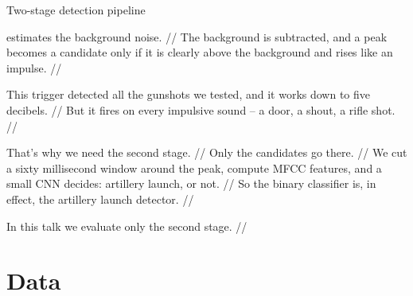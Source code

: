 \documentclass[aspectratio=169,10pt]{beamer}
\begin{document}
\begin{frame}{Two-stage detection pipeline}
{    estimates the background noise. // The background is subtracted, and a peak becomes a
    candidate only if it is clearly above the background and rises like an impulse.
    //\par\medskip
    This trigger detected all the gunshots we tested, and it works down to five decibels.
    // But it fires on every impulsive sound -- a door, a shout, a rifle shot. //\par\medskip
    That's why we need the second stage. // Only the candidates go there. // We cut a
    sixty millisecond window around the peak, compute MFCC features, and a small CNN
    decides: artillery launch, or not. // So the binary classifier is, in effect, the
    artillery launch detector. //\par\medskip
    In this talk we evaluate only the second stage. //
  }
\end{frame}

\section{Data}
\end{document}
